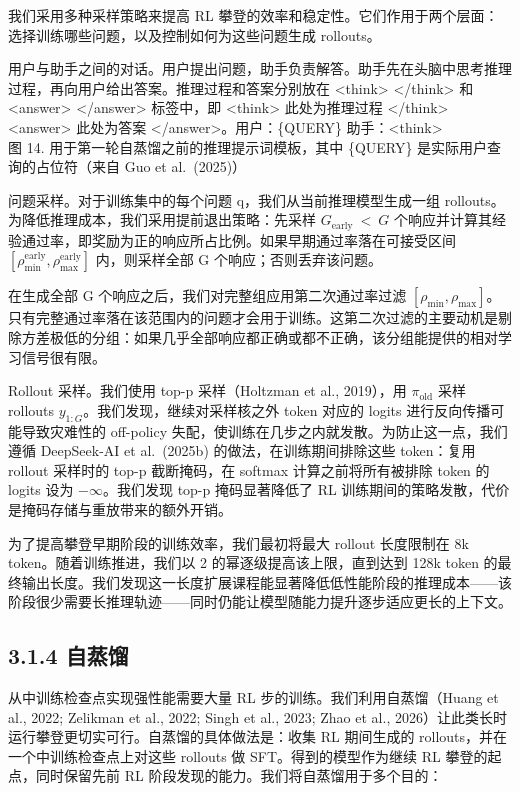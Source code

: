 我们采用多种采样策略来提高 RL 攀登的效率和稳定性。它们作用于两个层面：选择训练哪些问题，以及控制如何为这些问题生成 rollouts。



用户与助手之间的对话。用户提出问题，助手负责解答。助手先在头脑中思考推理过程，再向用户给出答案。推理过程和答案分别放在 <think> </think> 和 <answer> </answer> 标签中，即 <think> 此处为推理过程 </think> <answer> 此处为答案 </answer>。用户：\{QUERY\} 助手：<think> \\
图 14. 用于第一轮自蒸馏之前的推理提示词模板，其中 \{QUERY\} 是实际用户查询的占位符（来自 Guo et al.~(2025)）

问题采样。对于训练集中的每个问题 q，我们从当前推理模型生成一组 rollouts。为降低推理成本，我们采用提前退出策略：先采样 \(G _ { \mathrm { e a r l y } } \ < \ G\) 个响应并计算其经验通过率，即奖励为正的响应所占比例。如果早期通过率落在可接受区间 \([ \rho _ { \mathrm { m i n } } ^ { \mathrm { e a r l y } } , \rho _ { \mathrm { m a x } } ^ { \mathrm { e a r l y } } ]\) 内，则采样全部 G 个响应；否则丢弃该问题。

在生成全部 G 个响应之后，我们对完整组应用第二次通过率过滤 \([ \rho _ { \mathrm { m i n } } , \rho _ { \mathrm { m a x } } ]\)。只有完整通过率落在该范围内的问题才会用于训练。这第二次过滤的主要动机是剔除方差极低的分组：如果几乎全部响应都正确或都不正确，该分组能提供的相对学习信号很有限。

Rollout 采样。我们使用 top-p 采样（Holtzman et al., 2019），用 \(\pi _ { \mathrm { o l d } }\) 采样 rollouts \(y _ { 1 : G }\)。我们发现，继续对采样核之外 token 对应的 logits 进行反向传播可能导致灾难性的 off-policy 失配，使训练在几步之内就发散。为防止这一点，我们遵循 DeepSeek-AI et al.~(2025b) 的做法，在训练期间排除这些 token：复用 rollout 采样时的 top-p 截断掩码，在 softmax 计算之前将所有被排除 token 的 logits 设为 −$\infty$。我们发现 top-p 掩码显著降低了 RL 训练期间的策略发散，代价是掩码存储与重放带来的额外开销。

为了提高攀登早期阶段的训练效率，我们最初将最大 rollout 长度限制在 8k token。随着训练推进，我们以 2 的幂逐级提高该上限，直到达到 128k token 的最终输出长度。我们发现这一长度扩展课程能显著降低低性能阶段的推理成本——该阶段很少需要长推理轨迹——同时仍能让模型随能力提升逐步适应更长的上下文。

\subsection{3.1.4 自蒸馏}\label{selfdistillation}

从中训练检查点实现强性能需要大量 RL 步的训练。我们利用自蒸馏（Huang et al., 2022; Zelikman et al., 2022; Singh et al., 2023; Zhao et al., 2026）让此类长时运行攀登更切实可行。自蒸馏的具体做法是：收集 RL 期间生成的 rollouts，并在一个中训练检查点上对这些 rollouts 做 SFT。得到的模型作为继续 RL 攀登的起点，同时保留先前 RL 阶段发现的能力。我们将自蒸馏用于多个目的：


